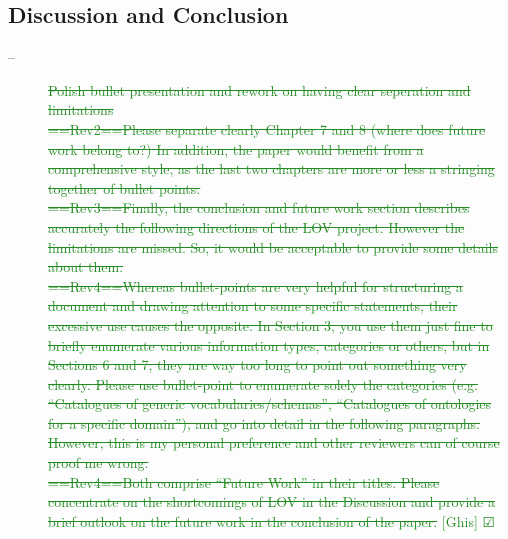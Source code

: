 \documentclass[a4paper,notitlepage]{article}
\newcommand{\progress}[1]{\textcolor{brown}{\textbf{[PROGRESS: #1]}}}
\newcommand\done[2]{ \item[--]\textcolor{ForestGreen}{\st{#1}} \hfill\textcolor{ForestGreen}{[#2] $\CheckedBox$}}%
\begin{document}
\subsection{Discussion and Conclusion}
\begin{description}
 \done{Polish bullet presentation and rework on having clear seperation and limitations \\
==Rev2==Please separate clearly Chapter 7 and 8 (where does future work belong to?) In addition, the paper would benefit from a comprehensive style, as the last two chapters are more or less a stringing together of bullet points.\\
==Rev3==Finally, the conclusion and future work section describes accurately the following directions of the LOV project. However the limitations are missed. So, it would be acceptable to provide some details about them.\\
==Rev4==Whereas bullet-points are very helpful for structuring a document and drawing attention to some specific statements, their excessive use causes the opposite. In Section 3, you use them just fine to briefly enumerate various information types, categories or others, but in Sections 6 and 7, they are way too long to point out something very clearly. Please use bullet-point to enumerate solely the categories (e.g. “Catalogues of generic vocabularies/schemas”, “Catalogues of ontologies for a specific domain”), and go into detail in the following paragraphs. However, this is my personal preference and other reviewers can of course proof me wrong.\\
==Rev4==Both comprise “Future Work” in their titles. Please concentrate on the shortcomings of LOV in the Discussion and provide a brief outlook on the future work in the conclusion of the paper.}{Ghis}


\end{description}
\end{document}
